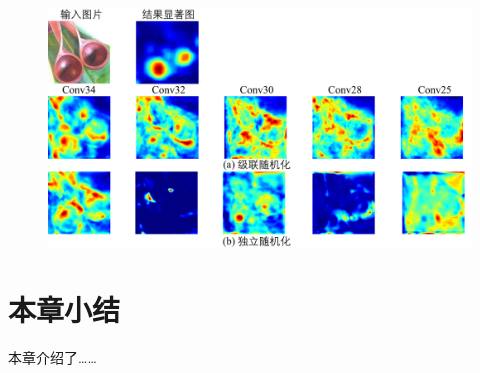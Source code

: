 \begin{figure}[h]
	\centering 
	\includegraphics[width=15cm]{fig/ch3/sanityCheck.pdf}
	\label{fig:sanitycheck}
\end{figure}


\section{本章小结}
本章介绍了……